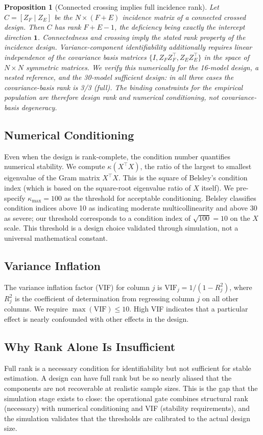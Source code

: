 \documentclass{ieeeaccess}
\theoremstyle{definition}
\theoremstyle{plain}
\newtheorem{proposition}{Proposition}
\begin{document}
\begin{proposition}[Connected crossing implies full incidence rank]
\label{prop:rank}
Let $C = [Z_F \mid Z_E]$ be the $N \times (F + E)$ incidence matrix of a connected crossed design. Then $C$ has rank $F + E - 1$, the deficiency being exactly the intercept direction $\mathbf{1}$. Connectedness and crossing imply the stated rank property of the incidence design. Variance-component identifiability additionally requires linear independence of the covariance basis matrices $\{I, Z_F Z_F^\top, Z_E Z_E^\top\}$ in the space of $N \times N$ symmetric matrices. We verify this numerically for the 16-model design, a nested reference, and the 30-model sufficient design: in all three cases the covariance-basis rank is 3/3 (full). The binding constraints for the empirical population are therefore design rank and numerical conditioning, not covariance-basis degeneracy.
\end{proposition}

\subsection{Numerical Conditioning}
Even when the design is rank-complete, the condition number quantifies numerical stability. We compute $\kappa(X^\top X)$, the ratio of the largest to smallest eigenvalue of the Gram matrix $X^\top X$. This is the square of Belsley's condition index (which is based on the square-root eigenvalue ratio of $X$ itself). We pre-specify $\kappa_{\max} = 100$ as the threshold for acceptable conditioning. Belsley classifies condition indices above 10 as indicating moderate multicollinearity and above 30 as severe; our threshold corresponds to a condition index of $\sqrt{100} = 10$ on the $X$ scale. This threshold is a design choice validated through simulation, not a universal mathematical constant.

\subsection{Variance Inflation}
The variance inflation factor (VIF) for column $j$ is $\text{VIF}_j = 1/(1 - R^2_j)$, where $R^2_j$ is the coefficient of determination from regressing column $j$ on all other columns. We require $\max(\text{VIF}) \leq 10$. High VIF indicates that a particular effect is nearly confounded with other effects in the design.

\subsection{Why Rank Alone Is Insufficient}
Full rank is a necessary condition for identifiability but not sufficient for stable estimation. A design can have full rank but be so nearly aliased that the components are not recoverable at realistic sample sizes. This is the gap that the simulation stage exists to close: the operational gate combines structural rank (necessary) with numerical conditioning and VIF (stability requirements), and the simulation validates that the thresholds are calibrated to the actual design size.
\end{document}
